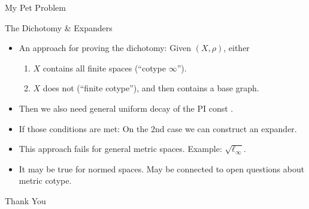 \documentclass[compress]{beamer}
\newtheorem{question}{Question}
\begin{document}
\begin{frame}{My Pet Problem}

\end{frame}

\begin{frame}{The Dichotomy \& Expanders}
\begin{itemize}[<+->]
\item An  approach for proving the dichotomy: Given $(X,\rho)$, either
\begin{enumerate}
\item $X$ contains all finite spaces (``cotype $\infty$'').
\item $X$ does not (``finite cotype''), and then contains a base graph.
\end{enumerate}
\item Then we also need general uniform  decay of the PI const .
\item If those conditions are met: On the 2nd case we can construct an expander.
\item This approach fails for general metric spaces. Example:  $\sqrt{\ell_\infty}$.
\item It may be true for normed spaces. May be connected to open questions about metric cotype.
\end{itemize}

\end{frame}

\begin{frame}
\vskip 0.7in

\begin{center}

{\Huge Thank You}
\end{center}
\end{frame}
\end{document}
